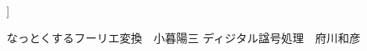 \documentclass[11pt, a4paper,twocolumn]{jarticle}
\begin{document}
\vspace{30truept}
]





\begin{thebibliography}{9}
   なっとくするフーリエ変換　小暮陽三
   ディジタル諡号処理　府川和彦
\end{thebibliography}
\end{document}
